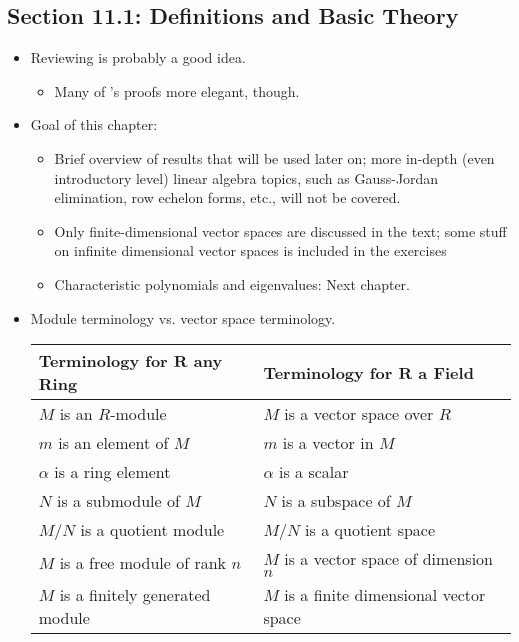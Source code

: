 \documentclass[../notes.tex]{subfiles}
\begin{document}
\subsection*{Section 11.1: Definitions and Basic Theory}
\begin{itemize}
    \item {}Reviewing \textcite{bib:LADRNotes} is probably a good idea.
    \begin{itemize}
        \item Many of \textcite{bib:DummitFoote}'s proofs more elegant, though.
    \end{itemize}
    \item Goal of this chapter:
    \begin{itemize}
        \item Brief overview of results that will be used later on; more in-depth (even introductory level) linear algebra topics, such as Gauss-Jordan elimination, row echelon forms, etc., will not be covered.
        \item Only finite-dimensional vector spaces are discussed in the text; some stuff on infinite dimensional vector spaces is included in the exercises
        \item Characteristic polynomials and eigenvalues: Next chapter.
    \end{itemize}
    \item Module terminology vs. vector space terminology.
    \begin{table}[h!]
        \centering
        \small
        \renewcommand{\arraystretch}{1.2}
        \begin{tabular}{ll}
            \textbf{Terminology for $\bm{R}$ any Ring} & \textbf{Terminology for $\bm{R}$ a Field}\\
            \hline
            $M$ is an $R$-module & $M$ is a vector space over $R$\\
            $m$ is an element of $M$ & $m$ is a vector in $M$\\
            $\alpha$ is a ring element & $\alpha$ is a scalar\\
            $N$ is a submodule of $M$ & $N$ is a subspace of $M$\\
            $M/N$ is a quotient module & $M/N$ is a quotient space\\
            $M$ is a free module of rank $n$ & $M$ is a vector space of dimension $n$\\
            $M$ is a finitely generated module & $M$ is a finite dimensional vector space\\

\end{tabular}
\end{table}
\end{itemize}
\end{document}

